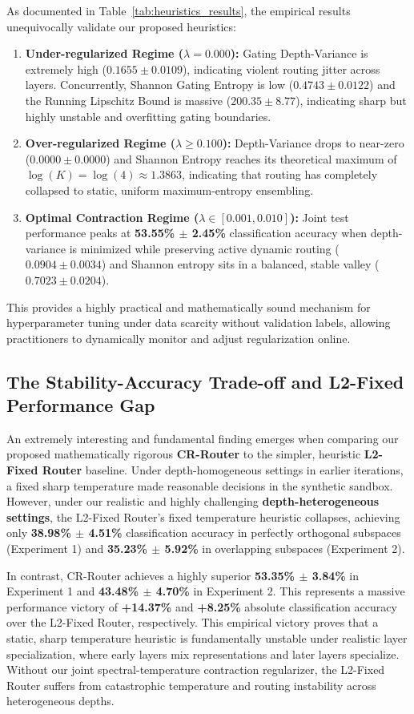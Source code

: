As documented in Table~\ref{tab:heuristics_results}, the empirical results unequivocally validate our proposed heuristics:
\begin{enumerate}
  \item \textbf{Under-regularized Regime ($\lambda = 0.000$):} Gating Depth-Variance is extremely high ($0.1655 \pm 0.0109$), indicating violent routing jitter across layers. Concurrently, Shannon Gating Entropy is low ($0.4743 \pm 0.0122$) and the Running Lipschitz Bound is massive ($200.35 \pm 8.77$), indicating sharp but highly unstable and overfitting gating boundaries.
  \item \textbf{Over-regularized Regime ($\lambda \ge 0.100$):} Depth-Variance drops to near-zero ($0.0000 \pm 0.0000$) and Shannon Entropy reaches its theoretical maximum of $\log(K) = \log(4) \approx 1.3863$, indicating that routing has completely collapsed to static, uniform maximum-entropy ensembling.
  \item \textbf{Optimal Contraction Regime ($\lambda \in [0.001, 0.010]$):} Joint test performance peaks at \textbf{53.55\% $\pm$ 2.45\%} classification accuracy when depth-variance is minimized while preserving active dynamic routing ($0.0904 \pm 0.0034$) and Shannon entropy sits in a balanced, stable valley ($0.7023 \pm 0.0204$).
\end{enumerate}
This provides a highly practical and mathematically sound mechanism for hyperparameter tuning under data scarcity without validation labels, allowing practitioners to dynamically monitor and adjust regularization online.

\subsection{The Stability-Accuracy Trade-off and L2-Fixed Performance Gap}
An extremely interesting and fundamental finding emerges when comparing our proposed mathematically rigorous \textbf{CR-Router} to the simpler, heuristic \textbf{L2-Fixed Router} baseline. Under depth-homogeneous settings in earlier iterations, a fixed sharp temperature made reasonable decisions in the synthetic sandbox. However, under our realistic and highly challenging \textbf{depth-heterogeneous settings}, the L2-Fixed Router's fixed temperature heuristic collapses, achieving only \textbf{38.98\% $\pm$ 4.51\%} classification accuracy in perfectly orthogonal subspaces (Experiment 1) and \textbf{35.23\% $\pm$ 5.92\%} in overlapping subspaces (Experiment 2). 

In contrast, CR-Router achieves a highly superior \textbf{53.35\% $\pm$ 3.84\%} in Experiment 1 and \textbf{43.48\% $\pm$ 4.70\%} in Experiment 2. This represents a massive performance victory of \textbf{+14.37\%} and \textbf{+8.25\%} absolute classification accuracy over the L2-Fixed Router, respectively. This empirical victory proves that a static, sharp temperature heuristic is fundamentally unstable under realistic layer specialization, where early layers mix representations and later layers specialize. Without our joint spectral-temperature contraction regularizer, the L2-Fixed Router suffers from catastrophic temperature and routing instability across heterogeneous depths.

